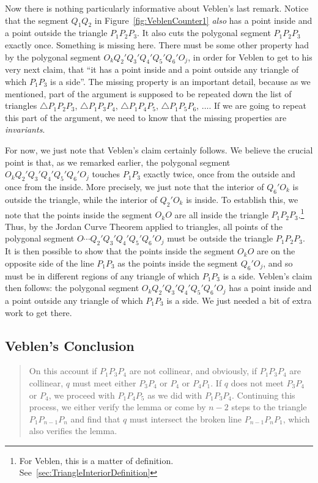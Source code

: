 Now there is nothing particularly informative about Veblen's last remark. Notice that the segment $Q_1Q_2$ in Figure~\ref{fig:VeblenCounter1} \emph{also} has a point inside and a point outside the triangle $P_1P_2P_3$. It also cuts the polygonal segment $P_1P_2P_3$ exactly once. Something is missing here. There must be some other property had by the polygonal segment $O_kQ_2'Q_3'Q_4'Q_5'Q_6'O_j$, in order for Veblen to get to his very next claim, that ``it has a point inside and a point outside any triangle of which $P_1P_3$ is a side''. The missing property is an important detail, because as we mentioned, part of the argument is supposed to be repeated down the list of triangles $\triangle P_1P_2P_3$, $\triangle P_1P_3P_4$, $\triangle P_1P_4P_5$, $\triangle P_1P_5P_6$, $\ldots$. If we are going to repeat this part of the argument, we need to know that the missing properties are \emph{invariants}.

For now, we just note that Veblen's claim certainly follows. We believe the crucial point is that, as we remarked earlier, the polygonal segment $O_kQ_2'Q_3'Q_4'Q_5'Q_6'O_j$ touches $P_1P_3$ exactly twice, once from the outside and once from the inside. More precisely, we just note that the interior of $Q_6'O_k$ is outside the triangle, while the interior of $Q_2'O_k$ is inside. To establish this, we note that the points inside the segment $O_kO$ are all inside the triangle $P_1P_2P_3$.\footnote{For Veblen, this is a matter of definition. See~\ref{sec:TriangleInteriorDefinition}} Thus, by the Jordan Curve Theorem applied to triangles, all points of the polygonal segment $O\cdots Q_2'Q_3'Q_4'Q_5'Q_6'O_j$ must be outside the triangle $P_1P_2P_3$. It is then possible to show that the points inside the segment $O_kO$ are on the opposite side of the line $P_1P_3$ as the points inside the segment $Q_6'O_j$, and so must be in different regions of any triangle of which $P_1P_3$ is a side. Veblen's claim then follows: the polygonal segment $O_kQ_2'Q_3'Q_4'Q_5'Q_6'O_j$ has a point inside and a point outside any triangle of which $P_1P_3$ is a side. We just needed a bit of extra work to get there.

\subsection{Veblen's Conclusion}
\begin{quote}On this account if $P_1P_3P_4$ are not collinear, and obviously, if $P_1P_3P_4$ are collinear, $q$ must meet either $P_3P_4$ or $P_4$ or $P_4P_1$. If $q$ does not meet $P_3P_4$ or $P_4$, we proceed with $P_1P_4P_5$ as we did with $P_1P_3P_4$. Continuing this process, we either verify the lemma or come by $n-2$ steps to the triangle $P_1P_{n-1}P_n$ and find that $q$ must intersect the broken line $P_{n-1}P_nP_1$, which also verifies the lemma.\end{quote}

